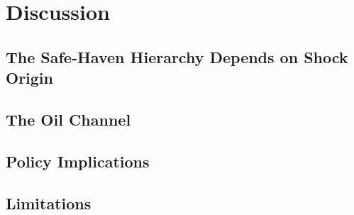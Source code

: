 
\chapter{Discussion}
\label{ch:discussion}



\section{The Safe-Haven Hierarchy Depends on Shock Origin}
\label{sec:disc_hierarchy}



\section{The Oil Channel}
\label{sec:disc_oil}



\section{Policy Implications}
\label{sec:disc_policy}



\section{Limitations}
\label{sec:disc_limitations}

